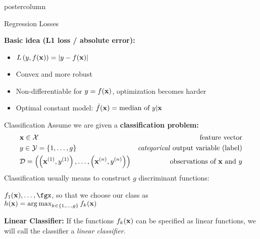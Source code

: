 \documentclass{beamer}
\begin{document}
\begin{frame}[fragile]{}
\begin{columns}
\begin{column}{.31\textwidth}
\begin{beamercolorbox}[center]{postercolumn}
\begin{minipage}{.98\textwidth}
{\begin{myblock}{Regression Losses}
            
              \textbf{Basic idea (L1 loss / absolute error):} 
            \begin{itemize}
            \setlength{\itemindent}{+.3in}
              \item $L\left(y, f(\mathbf{x})\right) = |y-f(\mathbf{x})|$
              \item Convex and more robust
              \item Non-differentiable for $y = f(\mathbf{x})$, optimization becomes harder
              \item Optimal constant model: $\hat{f}(\mathbf{x}) = \text{median of } y | \mathbf{x}$      
            \end{itemize}
          \end{myblock}

\begin{myblock}{Classification}
%             
Assume we are given a \textbf{classification problem:}
\begin{eqnarray*} & \mathbf{x} \in \mathcal{X} \quad & \text{feature vector}\\ & y \in \mathcal{Y} = \{1, \ldots, g\} \quad & \text{\emph{categorical} output variable (label)}\\ &\mathcal{D} = \left( \left(\mathbf{x}^{(1)}, y^{(1)}\right), \ldots, \left(\mathbf{x}^{(n)}, y^{(n)}\right)\right) & \text{observations of $\mathbf{x}$ and $y$} \end{eqnarray*}
\vspace*{1ex}
Classification usually means to construct $g$ discriminant functions:
  
$f_1(\xv), \ldots, \fgx$, so that we choose our class as \\ 
 $h(\mathbf{x}) = \operatorname{arg\,max}_{k \in \{1, \ldots, g\}} f_{k}(\mathbf{x})$ 
  
  \vspace*{2ex}


\textbf{Linear Classifier:} If the functions $f_{k}(\mathbf{x})$ can be specified as linear functions, we will call 
the classifier a \emph{linear classifier}.\\



\end{myblock}}
\end{minipage}
\end{beamercolorbox}
\end{column}
\end{columns}
\end{frame}
\end{document}
